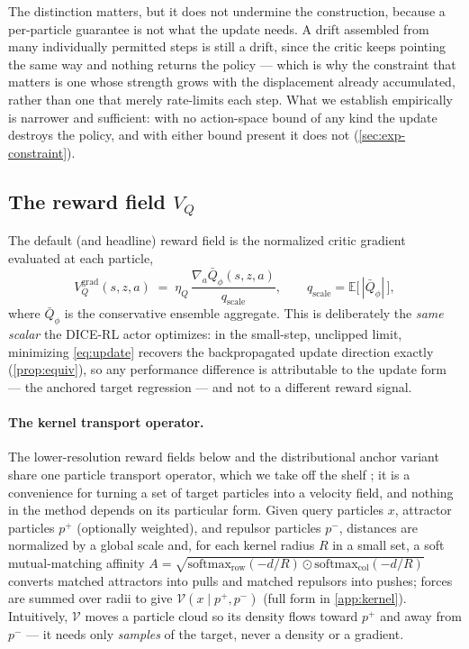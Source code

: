 The distinction matters, but it does not undermine the construction, because a
per-particle guarantee is not what the update needs. A drift assembled from
many individually permitted steps is still a drift, since the critic keeps
pointing the same way and nothing returns the policy --- which is why the
constraint that matters is one whose strength grows with the displacement
already accumulated, rather than one that merely rate-limits each step. What
we establish empirically is narrower and sufficient: with no action-space
bound of any kind the update destroys the policy, and with either bound
present it does not (\cref{sec:exp-constraint}).

\subsection{The reward field $V_Q$}
\label{sec:reward-field}

The default (and headline) reward field is the normalized critic
gradient evaluated at each particle,
\begin{equation}
  V_Q^{\mathrm{grad}}(s, z, a)
  \;=\; \eta_Q \, \frac{\nabla_a \bar{Q}_\phi(s, z, a)}{q_{\mathrm{scale}}},
  \qquad q_{\mathrm{scale}} = \mathbb{E}\big[\,|\bar{Q}_\phi|\,\big],
  \label{eq:vq-grad}
\end{equation}
where $\bar{Q}_\phi$ is the conservative ensemble aggregate. This is
deliberately the \emph{same scalar} the DICE-RL actor optimizes: in the
small-step, unclipped limit, minimizing \cref{eq:update} recovers the
backpropagated update direction exactly (\cref{prop:equiv}), so any
performance difference is attributable to the update form --- the anchored
target regression --- and not to a different reward signal.

\paragraph{The kernel transport operator.} The lower-resolution reward
fields below and the distributional anchor variant share one particle
transport operator, which we take off the shelf \citep{deng2026drifting}; it
is a convenience for turning a set of target particles into a velocity field,
and nothing in the method depends on its particular form. Given query particles $x$, attractor particles
$p^{+}$ (optionally weighted), and repulsor particles $p^{-}$, distances are
normalized by a global scale and, for each kernel radius $R$ in a small set,
a soft mutual-matching affinity
$A = \sqrt{\mathrm{softmax}_{\mathrm{row}}(-d/R) \odot
\mathrm{softmax}_{\mathrm{col}}(-d/R)}$ converts matched attractors into
pulls and matched repulsors into pushes; forces are summed over radii to
give $\mathcal{V}(x \mid p^{+}, p^{-})$ (full form in
\cref{app:kernel}). Intuitively, $\mathcal{V}$ moves a particle cloud so
its density flows toward $p^{+}$ and away from $p^{-}$ --- it needs only
\emph{samples} of the target, never a density or a gradient.

